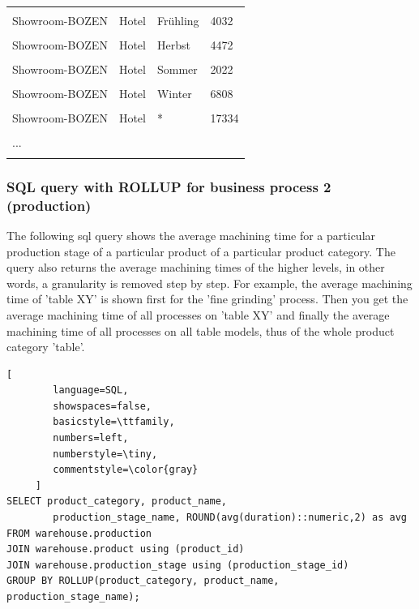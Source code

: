 \documentclass[letterpaper,12pt]{article}
\begin{document}
\begin{longtable}{p{4cm}p{4cm}p{3cm}p{2cm}}
        \hline \\
        Showroom-BOZEN & Hotel & Frühling & 4032 \\
        \hline \\
        Showroom-BOZEN & Hotel & Herbst & 4472 \\
        \hline \\
        Showroom-BOZEN & Hotel & Sommer & 2022 \\
        \hline \\
        Showroom-BOZEN & Hotel & Winter & 6808 \\
        \hline \\
        Showroom-BOZEN & Hotel & * & 17334 \\
        \hline \\
        ... \\
        \hline \\
\end{longtable} 
\endgroup

\subsubsection{SQL query with ROLLUP for business process 2 (production)}

The following sql query shows the average machining time for a particular production stage of a particular product of a particular product category. The query also returns the average machining times of the higher levels, in other words, a granularity is removed step by step. For example, the average machining time of 'table XY' is shown first for the 'fine grinding' process. Then you get the average machining time of all processes on 'table XY' and finally the average machining time of all processes on all table models, thus of the whole product category 'table'.

\begin{lstlisting}[
        language=SQL,
        showspaces=false,
        basicstyle=\ttfamily,
        numbers=left,
        numberstyle=\tiny,
        commentstyle=\color{gray}
     ]
SELECT product_category, product_name, 
        production_stage_name, ROUND(avg(duration)::numeric,2) as avg
FROM warehouse.production
JOIN warehouse.product using (product_id)
JOIN warehouse.production_stage using (production_stage_id)
GROUP BY ROLLUP(product_category, product_name, production_stage_name);
\end{lstlisting}    
\end{document}
